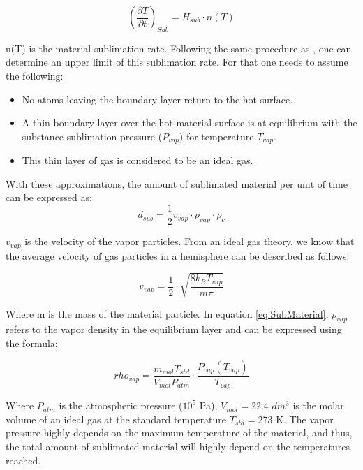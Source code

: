 \begin{equation}
    \left(\frac{\partial T}{\partial t}\right)_{Sub} = H_{sub}\cdot n(T)
\end{equation}

n(T) is the material sublimation rate. Following the same procedure as \parencite[][]{ref:SubRate}, one can determine an upper limit of this sublimation rate. For that one needs to assume the following: 

\begin{itemize}
    \item No atoms leaving the boundary layer return to the hot surface. 
    \item A thin boundary layer over the hot material surface is at equilibrium with the substance sublimation pressure ($P_{vap}$) for temperature $T_{vap}$. 
    \item This thin layer of gas is considered to be an ideal gas. 
\end{itemize}

With these approximations, the amount of sublimated material per unit of time can be expressed as: 
\begin{equation}
    d_{sub} = \frac{1}{2}v_{vap}\cdot \rho_{vap} \cdot \rho_{c}
    \label{eq:SubMaterial}
\end{equation}

$v_{vap}$ is the velocity of the vapor particles. From an ideal gas theory, we know that the average velocity of gas particles in a hemisphere can be described as follows: 

\begin{equation}
    v_{vap} = \frac{1}{2}\cdot \sqrt{\frac{8k_B T_{vap}}{m \pi}}
\end{equation}

Where m is the mass of the material particle. In equation \ref{eq:SubMaterial}, $\rho_{vap}$ refers to the vapor density in the equilibrium layer and can be expressed using the formula: 

\begin{equation}
    rho_{vap} = \frac{m_{mol} T_{std}}{V_{mol} P_{atm}}\cdot \frac{P_{vap}(T_{vap})}{T_{vap}}
\end{equation}

Where $P_{atm}$ is the atmospheric pressure ($10^5$ Pa), $V_{mol} = 22.4$ $dm^3$ is the molar volume of an ideal gas at the standard temperature $T_{std} = 273$ K. The vapor pressure highly depends on the maximum temperature of the material, and thus, the total amount of sublimated material will highly depend on the temperatures reached. 

